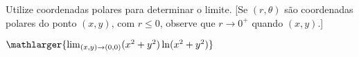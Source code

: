 Utilize coordenadas polares para determinar o limite. [Se $(r,\theta)$ são coordenadas polares do ponto $(x,y)$, com $r\leq 0$, observe que $r \rightarrow 0^+$ quando $(x,y)
$.]


$\mathlarger{\lim_{(x,y)\rightarrow(0,0)} (x^2+ y ^2 ) \ln(x^2+y^2)}$